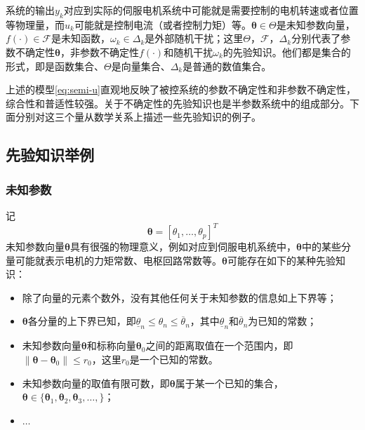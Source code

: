 系统的输出$y_{k}$对应到实际的伺服电机系统中可能就是需要控制的电机转速或者位置等物理量，而$u_k$可能就是控制电流（或者控制力矩）等。$\bm{\theta}\in\Theta$是未知参数向量，$f(\cdot)\in\mathcal{F}$是未知函数，$\omega_{k}\in\Delta_{k}$是外部随机干扰；这里$\Theta$，$\mathcal{F}$，$\Delta_{k}$分别代表了参数不确定性$\bm{\theta}$，非参数不确定性$f(\cdot)$和随机干扰$\omega_{k}$的先验知识。他们都是集合的形式，即是函数集合、$\Theta$是向量集合、$\Delta_{k}$是普通的数值集合。

上述的模型\eqref{eq:semi-u}直观地反映了被控系统的参数不确定性和非参数不确定性，综合性和普适性较强。关于不确定性的先验知识也是半参数系统中的组成部分。下面分别对这三个量从数学关系上描述一些先验知识的例子。
\subsection{先验知识举例}\label{subsect:2.2.2}
\subsubsection{未知参数}\label{subsubsect:2.2.2.1}
记
\begin{equation}%
\label{eq:}
\bm{\theta} = [\theta_{1},\ldots,\theta_{p}]^{T}
\end{equation}
未知参数向量$\bm{\theta}$具有很强的物理意义，例如对应到伺服电机系统中，$\bm{\theta}$中的某些分量可能就表示电机的力矩常数、电枢回路常数等。$\bm{\theta}$可能存在如下的某种先验知识：
\begin{itemize}
\item 除了向量的元素个数外，没有其他任何关于未知参数的信息如上下界等；
\item $\bm{\theta}$各分量的上下界已知，即$\underline{\theta}_{n}\leq\theta_{n}\leq\overline{\theta}_{n}$，其中$\underline{\theta}_{n}$和$\overline{\theta}_{n}$为已知的常数；
\item 未知参数向量$\bm{\theta}$和标称向量$\bm{\theta}_{0}$之间的距离取值在一个范围内，即$\|\bm{\theta}-\bm{\theta}_{0}\|\leq r_{0}$，这里$r_{0}$是一个已知的常数。
\item 未知参数向量的取值有限可数，即$\bm{\theta}$属于某一个已知的集合，$\bm{\theta}\in\{\bm{\theta}_{1},\bm{\theta}_{2},\bm{\theta}_{3},\dots,\}$；
\item $\dots$
\end{itemize}
